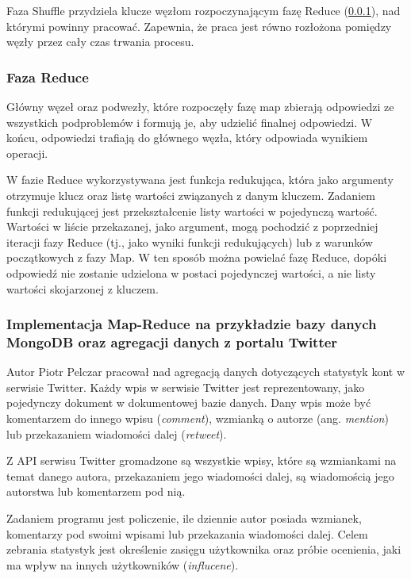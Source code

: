 Faza Shuffle przydziela klucze węzłom rozpoczynającym fazę Reduce (\ref{sec:mapreduce-reduce}), nad którymi powinny 
pracować. Zapewnia, że praca jest równo rozłożona pomiędzy węzły przez cały czas trwania procesu.

\subsubsection{Faza Reduce}
\label{sec:mapreduce-reduce}

Główny węzeł oraz podwezły, które rozpoczęły fazę map zbierają odpowiedzi ze wszystkich podproblemów i formują je, aby udzielić finalnej odpowiedzi. W końcu, odpowiedzi trafiają do głównego węzła, który odpowiada wynikiem operacji.

W fazie Reduce wykorzystywana jest funkcja redukująca, która jako argumenty otrzymuje klucz oraz listę wartości związanych z danym kluczem. Zadaniem funkcji redukującej jest przekształcenie listy wartości w pojedynczą wartość. Wartości w liście przekazanej, jako argument, mogą pochodzić z poprzedniej iteracji fazy Reduce (tj., jako wyniki funkcji redukujących) lub z warunków początkowych z fazy Map. W ten sposób można powielać fazę Reduce, dopóki odpowiedź nie zostanie udzielona w postaci pojedynczej wartości, a nie listy wartości skojarzonej z kluczem.

\subsubsection{Implementacja Map-Reduce na przykładzie bazy danych MongoDB oraz agregacji danych z portalu Twitter}
\label{sec:mapreduce-implementation-twitter}

Autor Piotr Pelczar pracował nad agregacją danych dotyczących statystyk kont w serwisie Twitter. Każdy wpis w serwisie Twitter jest reprezentowany, jako pojedynczy dokument w dokumentowej bazie danych. Dany wpis może być komentarzem do innego wpisu (\emph{comment}), wzmianką o autorze (ang. \emph{mention}) lub przekazaniem wiadomości dalej (\emph{retweet}).

Z API serwisu Twitter gromadzone są wszystkie wpisy, które są wzmiankami na temat danego autora, przekazaniem jego wiadomości dalej, są wiadomością jego autorstwa lub komentarzem pod nią.

Zadaniem programu jest policzenie, ile dziennie autor posiada wzmianek, komentarzy pod swoimi wpisami lub przekazania wiadomości dalej. Celem zebrania statystyk jest określenie zasięgu użytkownika oraz próbie ocenienia, jaki ma wpływ na innych użytkowników (\emph{influcene}).

